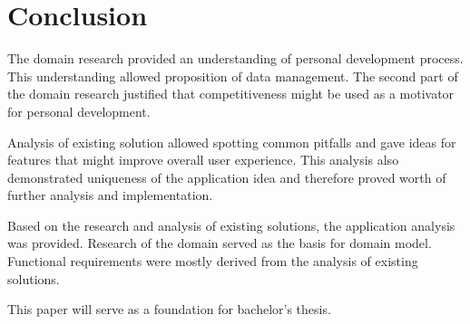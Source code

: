 
\chapter{Conclusion}\label{ch:conclusion}

The domain research provided an understanding of personal development process.
This understanding allowed proposition of data management.
The second part of the domain research justified that competitiveness might be used as a motivator for personal development.

Analysis of existing solution allowed spotting common pitfalls and gave ideas for features that might improve overall user experience.
This analysis also demonstrated uniqueness of the application idea and therefore proved worth of further analysis and implementation.

Based on the research and analysis of existing solutions, the application analysis was provided.
Research of the domain served as the basis for domain model.
Functional requirements were mostly derived from the analysis of existing solutions.

This paper will serve as a foundation for bachelor's thesis.